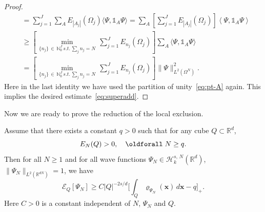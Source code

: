 \documentclass[AHL, Unicode, longabstracts, published]{cedram}
\newcommand*\R {\mathbb{R}}
\newcommand\1{{\ensuremath {\mathds 1} }}
\newcommand{\bx}{\mathbf{x}}
\newcommand{\cH}{\mathcal{H}}
\newcommand{\cE}{\mathcal{E}}
\renewcommand*{\forall}{\mathrel{\oldforall}}
\begin{document}
\begin{proof}
\begin{align*}
&=
\sum_{j=1}^J \sum_{A} E_{|A_j|}(\Omega_j) \langle \Psi, \1_A \Psi\rangle =
\sum_{A} \left[\sum_{j=1}^J E_{|A_j|}(\Omega_j) \right] \left\langle \Psi, \1_A \Psi\right\rangle\\
&\ge
\left[\hspace{1pt} \min_{\{n_j\}\,\in\,\mathbb{N}_0^J \, s.t. \, \sum_{j} n_j=N} \, \sum_{j=1}^J E_{n_j}(\Omega_j) \right] \sum_A \langle \Psi, \1_A \Psi\rangle\\
&=
\left[\hspace{1pt} \min_{\{n_j\}\,\in\,\mathbb{N}_0^J \, s.t. \, \sum_{j} n_j=N} \, \sum_{j=1}^J E_{n_j}(\Omega_j) \right] \|\Psi\|^2_{L^2(\Omega^N)}.
\end{align*}
Here in the last identity we have used the partition of unity~\eqref{eq:pt-A} again. This implies the desired estimate~\eqref{eq:superadd}.
\end{proof}

Now we are ready to prove the reduction of the local exclusion.

\begin{lemm}\label{lem:sim-local-exclusion}
Assume that there exists a constant $q>0$ such that for any cube $Q\subset \R^d$,
\begin{equation}\label{eq:local-exclusion-positivity}
E_N(Q) > 0, \quad \forall N\ge q.
\end{equation}
Then for all $N \ge 1$ and for all wave functions $\Psi_N\in \cH^{s,\,N}_k(\R^d)$, $\|\Psi_N\|_{L^2(\R^{dN})}=1$, we have
\begin{equation}\label{eq:loca-exclusion-vanishing}
\cE_Q[\Psi_N] \ge C |Q|^{-2s/d} \biggl[\int_Q \varrho_{\Psi_N}(\bx)\,d\bx - q \biggr]_+.
\end{equation}
Here $C>0$ is a constant independent of $N$, $\Psi_N$ and $Q$.
\end{lemm}
\end{document}
